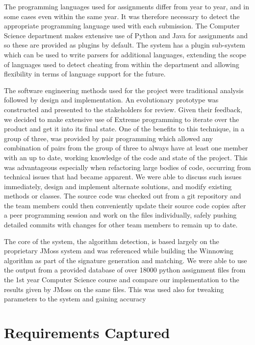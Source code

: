 \documentclass[11pt,a4paper]{article}
\begin{document}
The programming languages used for assignments differ from year to year, and in some cases even within the same year. It was therefore necessary to detect the appropriate programming language used with each submission. The Computer Science department makes extensive use of Python and Java for assignments and so these are provided as plugins by default. The system has a plugin sub-system which can be used to write parsers for additional languages, extending the scope of languages used to detect cheating from within the department and allowing flexibility in terms of language support for the future.

The software engineering methods used for the project were traditional analysis followed by design and implementation. An evolutionary prototype was constructed and presented to the stakeholders for review. Given their feedback, we decided to make extensive use of Extreme programming to iterate over the product and get it into its final state. One of the benefits to this technique, in a group of three, was provided by pair programming which allowed any combination of pairs from the group of three to always have at least one member with an up to date, working knowledge of the code and state of the project. This was advantageous especially when refactoring large bodies of code, occurring from technical issues that had became apparent. We were able to discuss such issues immediately, design and implement alternate solutions, and modify existing methods or classes. The source code was checked out from a git repository and the team members could then conveniently update their source code copies after a peer programming session and work on the files individually, safely pushing detailed commits with changes for other team members to remain up to date.

The core of the system, the algorithm detection, is based largely on the proprietary
JMoss system and was referenced while building the Winnowing algorithm as part of the
signature generation and matching. We were able to use the output from a provided database of over 18000 python assignment files from the 1st year Computer Science course and compare our implementation to the results given by JMoss on the same files. This was used also for tweaking parameters to the system and gaining accuracy

\section{Requirements Captured}
\end{document}
